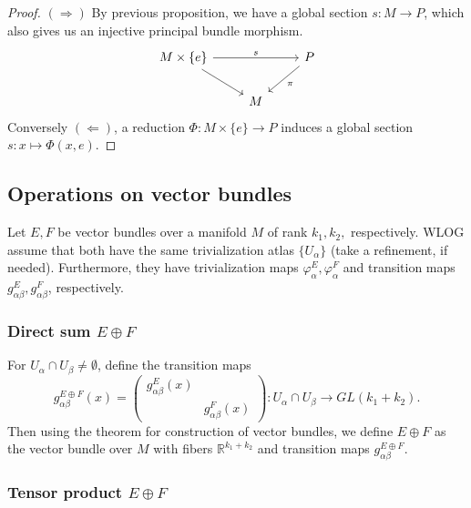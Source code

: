 \documentclass[10pt, a4paper]{article}
\newenvironment{noticeC}{%
  \tcolorbox[%
  notitle,
  empty,
  enhanced,  %
  breakable,
  coltext=black, 
  fontupper=\rmfamily,
  noparskip,
  sharp corners,
  boxrule=-1pt,  %
  frame hidden,
  left=7pt,  %
  right=7pt,
  top=5pt,
  bottom=5pt,
  before skip=2.5ex plus 2pt,
  after skip=2.5ex plus 2pt,
  overlay unbroken and last={%
  },
  ]}
{\endtcolorbox}
\newenvironment{myproof}%
  {\begin{noticeC}\begin{proof}}%
  {\end{proof}\end{noticeC}}
\newcommand{\R}{\mathbb {R}}
\begin{document}
\begin{myproof}
  $(\Rightarrow)$ By previous proposition, we have a global section $s: M \to P$, which also gives us an injective principal bundle morphism.
  \[\begin{tikzcd}
    {M \times \{e\}} && P \\
    & M
    \arrow["s", from=1-1, to=1-3]
    \arrow[from=1-1, to=2-2]
    \arrow["\pi", from=1-3, to=2-2]
  \end{tikzcd}\]
  Conversely $(\Leftarrow)$, a reduction $\Phi: M \times \{e\} \to P$ induces a global section $s: x \mapsto \Phi(x, e)$.
\end{myproof}

\subsection{Operations on vector bundles}

Let $E, F$ be vector bundles over a manifold $M$ of rank $k_1, k_2,$ respectively.
WLOG assume that both have the same trivialization atlas $\{U_\alpha\}$ (take a refinement, if needed).
Furthermore, they have trivialization maps $\varphi_\alpha ^E, \varphi_\alpha ^F$ and transition maps 
$g_{\alpha \beta} ^E, g_{\alpha \beta} ^F$, respectively.

\subsubsection*{Direct sum $E \oplus F$}

For $U_\alpha \cap U_\beta \neq \emptyset$, define the transition maps 
$$g_{\alpha \beta} ^{E \oplus F} (x) = \begin{pmatrix}
  g_{\alpha \beta} ^E (x) & \\
  & g_{\alpha \beta} ^F (x)
\end{pmatrix}: U_\alpha \cap U_\beta \to GL(k_1 + k_2).$$
Then using the theorem for construction of vector bundles,
we define $E \oplus F$ as the vector bundle over $M$ with fibers $\R^{k_1 + k_2}$ and transition maps $g_{\alpha \beta} ^{E \oplus F}$.

\subsubsection*{Tensor product $E \oplus F$}
\end{document}
